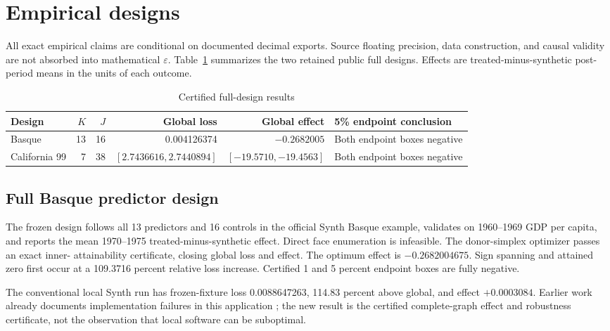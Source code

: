 \documentclass[10pt]{article}
\theoremstyle{definition}
\newcommand{\eps}{\varepsilon}
\begin{document}
\section{Empirical designs}

All exact empirical claims are conditional on documented decimal exports.
Source floating precision, data construction, and causal validity are not
absorbed into mathematical $\eps$.  Table~\ref{tab:empirical} summarizes the
two retained public full designs.  Effects are treated-minus-synthetic post-period means in
the units of each outcome.

\begin{table}[ht]
\centering
\caption{Certified full-design results}\label{tab:empirical}
\small
\begin{tabularx}{\textwidth}{@{}lrrrrX@{}}
\toprule
Design & $K$ & $J$ & Global loss & Global effect & 5\% endpoint conclusion \\
\midrule
Basque & 13 & 16 & 0.004126374 & $-0.2682005$ & Both endpoint boxes negative \\
California 99 & 7 & 38 & $[2.7436616,2.7440894]$ & $[-19.5710,-19.4563]$ & Both endpoint boxes negative \\
\bottomrule
\end{tabularx}
\end{table}

\subsection{Full Basque predictor design}

The frozen design follows all 13 predictors and 16 controls in the official
\textsf{Synth} Basque example, validates on 1960--1969 GDP per capita, and
reports the mean 1970--1975 treated-minus-synthetic effect.  Direct face
enumeration is infeasible.  The donor-simplex optimizer passes an exact inner-
attainability certificate, closing global loss and effect.  The optimum effect
is $-0.2682004675$.  Sign spanning and attained zero first occur at a 109.3716
percent relative loss increase.  Certified 1 and 5 percent endpoint boxes are
fully negative.

The conventional local \textsf{Synth} run has frozen-fixture loss
0.0088647263, 114.83 percent above global, and effect $+0.0003084$.  Earlier
work already documents implementation failures in this application
\cite{becker2018}; the new result is the certified complete-graph effect and
robustness certificate, not the observation that local software can be
suboptimal.
\end{document}
